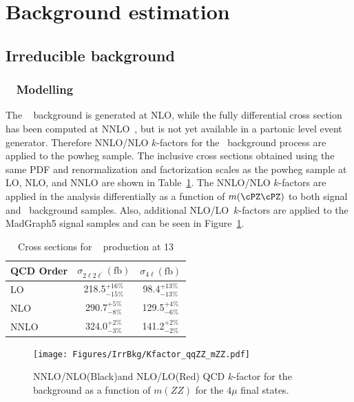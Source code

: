 
\section{Background estimation}
\label{sec:bkgd}
\subsection{Irreducible background}
\label{sec:irrbkgd}
\subsubsection{\qqZZ~ Modelling}

The \qqZZ~ background is generated at NLO, while the fully differential cross section has been computed at 
NNLO~\cite{Grazzini2015407}, but is not yet available in a partonic level event generator. Therefore NNLO/NLO 
$k$-factors for the \qqZZ~background process are applied to the {\sc powheg} sample. The inclusive cross 
sections obtained using the same PDF and renormalization and factorization scales as the {\sc powheg} sample
at LO, NLO, and NNLO are shown in Table~\ref{tab:qqZZXS}. The NNLO/NLO $k$-factors are applied in the analysis
differentially as a function of $m(\cPZ\cPZ)$ to both signal and \qqZZ~background samples. Also, additional NLO/LO~$k$-factors 
are applied to the {\sc MadGraph5} signal samples and can be seen in
Figure~\ref{fig:qqZZKfactor}.

\begin{table}[h]
    \centering
    \begin{tabular}{|l|c|c|} 
\hline %
QCD Order  & $\sigma_{2\ell2\ell^{\prime}} (\mathrm{fb})$  & $\sigma_{4\ell} (\mathrm{fb})$  \\
\hline %
LO    & 218.5$^{+16\%}_{-15\%}$ & 98.4$^{+13\%}_{-13\%}$ \\
NLO   & 290.7$^{+5\%}_{-8\%}$   & 129.5$^{+4\%}_{-6\%}$ \\
NNLO  & 324.0$^{+2\%}_{-3\%}$   & 141.2$^{+2\%}_{-2\%}$ \\
\hline %
    \end{tabular}
    \caption{Cross sections for \qqZZ~ production at 13 \TeV}
    \label{tab:qqZZXS}
\end{table}

\begin{figure}[!htb]
\vspace*{0.3cm}
\begin{center}
\texttt{[image: Figures/IrrBkg/Kfactor\_qqZZ\_mZZ.pdf]}
\caption{NNLO/NLO(Black)and NLO/LO(Red) QCD $k$-factor for the \qqZZ~ background as a function of $m(ZZ)$ for the $4\mu$ final states. 
\label{fig:qqZZKfactor}}
\end{center}
\end{figure}


